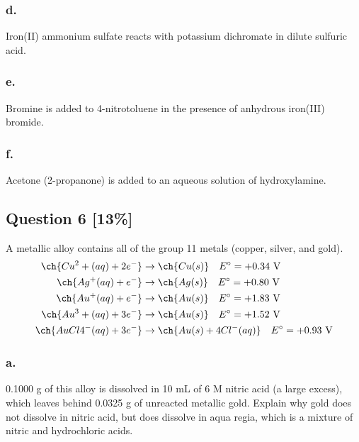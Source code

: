 \documentclass[11pt,letterpaper]{article}
\begin{document}
\subsubsection*{d.} Iron(II) ammonium sulfate reacts with potassium dichromate in dilute sulfuric acid.
\vspace{2cm}

\subsubsection*{e.} Bromine is added to 4-nitrotoluene in the presence of anhydrous iron(III) bromide.
\vspace{2cm}

\subsubsection*{f.} Acetone (2-propanone) is added to an aqueous solution of hydroxylamine.
\vspace{2cm}

\newpage
\subsection*{Question 6 [13\%]}
A metallic alloy contains all of the group 11 metals (copper, silver, and gold).
\begin{align*}
    \ch{Cu^2+(aq) + 2e^-} &\rightarrow \ch{Cu(s)} \quad E^\circ = +0.34\text{ V} \\
    \ch{Ag^+(aq) + e^-} &\rightarrow \ch{Ag(s)} \quad E^\circ = +0.80\text{ V} \\
    \ch{Au^+(aq) + e^-} &\rightarrow \ch{Au(s)} \quad E^\circ = +1.83\text{ V} \\
    \ch{Au^3+(aq) + 3e^-} &\rightarrow \ch{Au(s)} \quad E^\circ = +1.52\text{ V} \\
    \ch{AuCl4^-(aq) + 3e^-} &\rightarrow \ch{Au(s) + 4Cl^-(aq)} \quad E^\circ = +0.93\text{ V}
\end{align*}

\subsubsection*{a.}
0.1000 g of this alloy is dissolved in 10 mL of 6 M nitric acid (a large excess), which leaves behind 0.0325 g of unreacted metallic gold. Explain why gold does not dissolve in nitric acid, but does dissolve in aqua regia, which is a mixture of nitric and hydrochloric acids.
\vspace{4cm}
\end{document}

